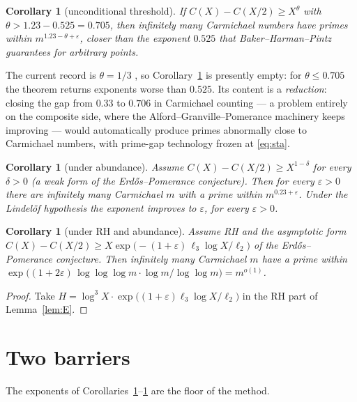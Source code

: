 \documentclass[11pt]{amsart}
\newtheorem{corollary}[theorem]{Corollary}
\newcommand{\llog}{\log\log}
\newcommand{\lllog}{\log\log\log}
\newcommand{\CC}{C}
\begin{document}
\begin{corollary}[unconditional threshold]
\label{cor:threshold}
If $\CC(X) - \CC(X/2) \ge X^{\theta}$ with $\theta > 1.23 - 0.525 = 0.705$,
then infinitely many Carmichael numbers have primes within
$m^{1.23 - \theta + \varepsilon}$, closer than the exponent $0.525$
that Baker--Harman--Pintz \cite{BHP} guarantees for arbitrary points.
\end{corollary}

The current record is $\theta = 1/3$ \cite{Har}, so
Corollary~\ref{cor:threshold} is presently empty: for $\theta \le 0.705$ the
theorem returns exponents worse than $0.525$. Its content is a
\emph{reduction}: closing the gap from $0.33$ to $0.706$ in Carmichael
counting --- a problem entirely on the composite side, where the
Alford--Granville--Pomerance machinery keeps improving --- would
automatically produce primes abnormally close to Carmichael numbers, with
prime-gap technology frozen at \eqref{eq:sta}.

\begin{corollary}[under abundance]
\label{cor:abundance}
Assume $\CC(X) - \CC(X/2) \ge X^{1-\delta}$ for every $\delta > 0$ (a weak
form of the Erd\H{o}s--Pomerance conjecture). Then for every
$\varepsilon > 0$ there are infinitely many Carmichael $m$ with a prime
within $m^{0.23 + \varepsilon}$. Under the Lindel\"of hypothesis the exponent
improves to $\varepsilon$, for every $\varepsilon > 0$.
\end{corollary}

\begin{corollary}[under RH and abundance]
\label{cor:rh}
Assume RH and the asymptotic form
$\CC(X) - \CC(X/2) \ge X \exp\bigl(-(1+\varepsilon)\,\ell_3 \log X/\ell_2\bigr)$
of the Erd\H{o}s--Pomerance conjecture. Then infinitely many Carmichael $m$
have a prime within
$\exp\bigl((1+2\varepsilon)\,\lllog m \cdot \log m/\llog m\bigr) = m^{o(1)}$.
\end{corollary}

\begin{proof}
Take $H = \log^3 X \cdot \exp\bigl((1+\varepsilon)\ell_3 \log X/\ell_2\bigr)$
in the RH part of Lemma~\ref{lem:E}.
\end{proof}

\section{Two barriers}
\label{sec:barriers}

The exponents of Corollaries~\ref{cor:abundance}--\ref{cor:rh} are the floor
of the method.
\end{document}
